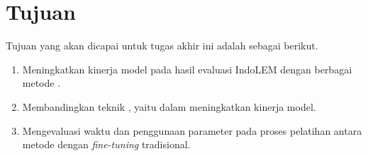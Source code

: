 \section{Tujuan}

Tujuan yang akan dicapai untuk tugas akhir ini adalah sebagai berikut.

\begin{enumerate}
    \item Meningkatkan kinerja model pada hasil evaluasi IndoLEM dengan berbagai metode \PEFT.
    \item Membandingkan teknik \PEFT, yaitu \methodPEFT dalam meningkatkan kinerja model.
    \item Mengevaluasi waktu dan penggunaan parameter pada proses pelatihan antara metode \PEFT dengan \textit{fine-tuning} tradisional.
\end{enumerate}
